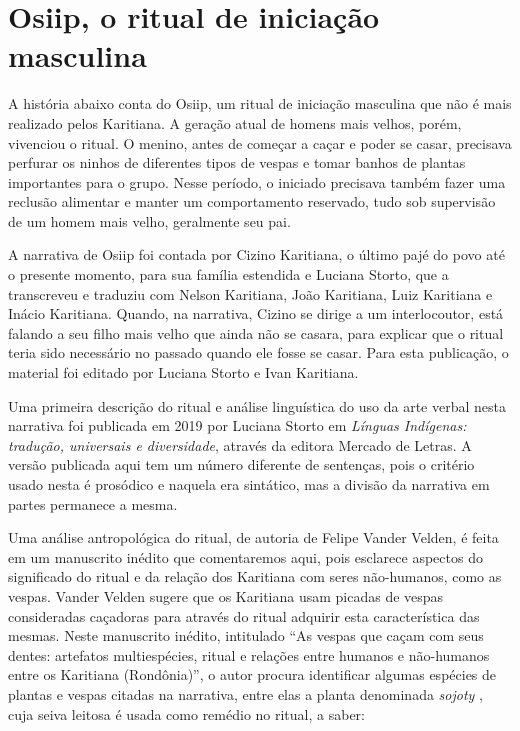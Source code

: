 \chapter{Osiip, o ritual de iniciação masculina}

A história abaixo conta do Osiip, um ritual de iniciação masculina que
não é mais realizado pelos Karitiana. A geração atual de homens mais
velhos, porém, vivenciou o ritual. O menino, antes de começar a caçar e
poder se casar, precisava perfurar os ninhos de diferentes tipos de
vespas e tomar banhos de plantas importantes para o grupo. Nesse
período, o iniciado precisava também fazer uma reclusão alimentar e
manter um comportamento reservado, tudo sob supervisão de um homem mais
velho, geralmente seu pai.

A narrativa de Osiip foi contada por Cizino Karitiana, o último pajé do
povo até o presente momento, para sua família estendida e Luciana
Storto, que a transcreveu e traduziu com Nelson Karitiana, João
Karitiana, Luiz Karitiana e Inácio Karitiana. Quando, na narrativa,
Cizino se dirige a um interlocoutor, está falando a seu filho mais velho
que ainda não se casara, para explicar que o ritual teria sido
necessário no passado quando ele fosse se casar. Para esta publicação, o
material foi editado por Luciana Storto e Ivan Karitiana.

Uma primeira descrição do ritual e análise linguística do uso da arte
verbal nesta narrativa foi publicada em 2019 por Luciana Storto em
\emph{Línguas Indígenas: tradução, universais e diversidade}, através da
editora Mercado de Letras. A versão publicada aqui tem um número
diferente de sentenças, pois o critério usado nesta é prosódico e
naquela era sintático, mas a divisão da narrativa em partes permanece a
mesma.

Uma análise antropológica do ritual, de autoria de Felipe Vander Velden,
é feita em um manuscrito inédito que comentaremos aqui, pois esclarece
aspectos do significado do ritual e da relação dos Karitiana com seres
não-humanos, como as vespas. Vander Velden sugere que os Karitiana usam
picadas de vespas consideradas caçadoras para através do ritual adquirir
esta característica das mesmas. Neste manuscrito inédito, intitulado
``As vespas que caçam com seus dentes: artefatos multiespécies, ritual e
relações entre humanos e não-humanos entre os Karitiana (Rondônia)'', o
autor procura identificar algumas espécies de plantas e vespas citadas
na narrativa, entre elas a planta denominada \emph{sojoty} , cuja seiva
leitosa é usada como remédio no ritual, a saber:


